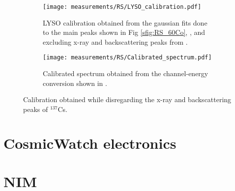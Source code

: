 \begin{figure}[H]
  \begin{subfigure}[t]{\textwidth}
    \centering
    \texttt{[image: measurements/RS/LYSO\_calibration.pdf]}
    \caption{\label{sfig:RS_LYSO_calibration}LYSO calibration obtained from the gaussian fits done to the main peaks shown in Fig \ref{sfig:RS_60Co}, , and excluding x-ray and backscattering peaks from .}
  \end{subfigure}
  \medskip
  \begin{subfigure}[t]{\textwidth}
    \centering
    \texttt{[image: measurements/RS/Calibrated\_spectrum.pdf]}
    \caption{\label{sfig:RS_LYSO_calibrated_spectrum}Calibrated spectrum obtained from the channel-energy conversion shown in .}
  \end{subfigure}
  \caption{\label{fig:RS_calibration}Calibration obtained while disregarding the x-ray and backscattering peaks of $^{137}$Cs.}
\end{figure}


\section{CosmicWatch electronics}

\section{NIM}